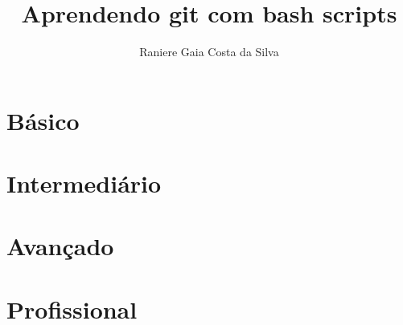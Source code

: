 \documentclass[12pt,a4paper]{book}
\begin{document}
\title{Aprendendo git com bash scripts}
\author{Raniere Gaia Costa da Silva}
\maketitle

\tableofcontents
\lstlistoflistings

\chapter{B\'{a}sico}





\chapter{Intermedi\'{a}rio}




\chapter{Avan\c{c}ado}





\chapter{Profissional}

\end{document}
